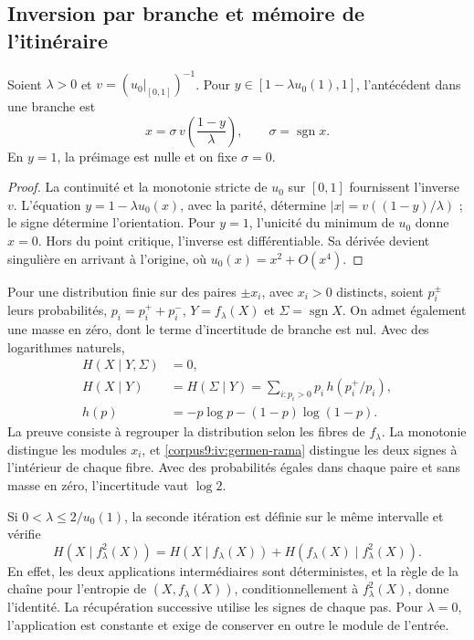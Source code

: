 \subsection{Inversion par branche et mémoire de l’itinéraire
}
\begin{proposition}
\label{corpus9:iv:germen-inversa}
Soient \(\lambda>0\) et
\(v=(u_0|_{[0,1]})^{-1}\). Pour
\(y\in[1-\lambda u_0(1),1]\), l’antécédent dans une branche est
\begin{equation}
 x=\sigma\,v\!\left(\frac{1-y}{\lambda}\right),
 \qquad \sigma=\operatorname{sgn}x.
 \label{corpus9:iv:germen-rama}
\end{equation}
En \(y=1\), la préimage est nulle et on fixe \(\sigma=0\).

\end{proposition}
\begin{proof}
La continuité et la monotonie stricte de \(u_0\) sur
\([0,1]\) fournissent l’inverse \(v\).
L’équation \(y=1-\lambda u_0(x)\), avec la parité,
détermine \(|x|=v((1-y)/\lambda)\) ; le signe détermine
l’orientation. Pour \(y=1\), l’unicité du minimum de \(u_0\)
donne \(x=0\). Hors du point critique, l’inverse est différentiable.
Sa dérivée devient singulière en arrivant à l’origine, où
\(u_0(x)=x^2+O(x^4)\).

\end{proof}

Pour une distribution finie sur des paires \(\pm x_i\), avec
\(x_i>0\) distincts, soient \(p_i^\pm\) leurs probabilités,
\(p_i=p_i^++p_i^-\), \(Y=f_\lambda(X)\) et
\(\Sigma=\operatorname{sgn}X\). On admet également une masse
en zéro, dont le terme d’incertitude de branche est nul. Avec
des logarithmes naturels,
\begin{align}
 H(X\mid Y,\Sigma)&=0,\\
 H(X\mid Y)&=H(\Sigma\mid Y)
   =\sum_{i:p_i>0}p_i\,h(p_i^+/p_i),\\
 h(p)&=-p\log p-(1-p)\log(1-p).
 \label{corpus9:iv:germen-entropia}
\end{align}
La preuve consiste à regrouper la distribution selon les fibres
de \(f_\lambda\). La monotonie distingue les modules \(x_i\),
et \eqref{corpus9:iv:germen-rama} distingue les deux signes
à l’intérieur de chaque fibre. Avec des probabilités égales dans chaque paire
et sans masse en zéro, l’incertitude vaut \(\log2\).

Si \(0<\lambda\leq2/u_0(1)\), la seconde itération est
définie sur le même intervalle et vérifie
\[
 H(X\mid f_\lambda^2(X))
 =H(X\mid f_\lambda(X))
  +H(f_\lambda(X)\mid f_\lambda^2(X)).
\]
En effet, les deux applications intermédiaires sont déterministes,
et la règle de la chaîne pour l’entropie de
\((X,f_\lambda(X))\), conditionnellement à \(f_\lambda^2(X)\),
donne l’identité. La récupération successive utilise les signes
de chaque pas. Pour \(\lambda=0\), l’application est constante
et exige de conserver en outre le module de l’entrée.

